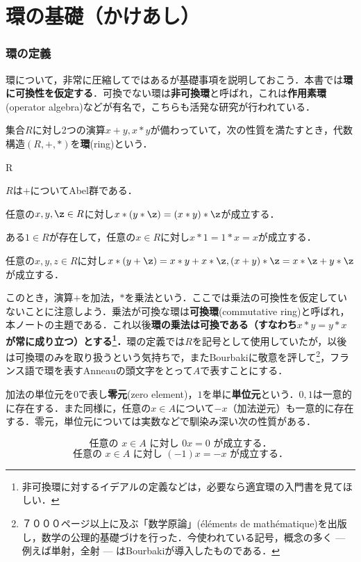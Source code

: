 \setcounter{part}{-1}
\part[Definition of Ring and more...]{環の基礎（かけあし）}
\section{環の定義}

環について，非常に圧縮してではあるが基礎事項を説明しておこう．本書では\textbf{環に可換性を仮定する}．可換でない環は\textbf{非可換環}と呼ばれ，これは\textbf{作用素環}(operator algebra)などが有名で，こちらも活発な研究が行われている．
\begin{defi}[環]
	集合$R$に対し2つの演算$x+y,x*y$が備わっていて，次の性質を満たすとき，代数構造$(R,+,*)$を\textbf{環}(ring)という．
	\begin{defiterm}{R}
		\item $R$は$+$についてAbel群である．
		\item 任意の$x,y,\z\in R$に対し$x*(y*\z)=(x*y)*\z$が成立する．
		\item ある$1\in R$が存在して，任意の$x\in R$に対し$x*1=1*x=x$が成立する．
		\item 任意の$x,y,z\in R$に対し$x*(y+\z)=x*y+x*\z,(x+y)*\z=x*\z+y*\z$が成立する．
	\end{defiterm}
\end{defi}

このとき，演算$+$を加法，$*$を乗法という．ここでは乗法の可換性を仮定していないことに注意しよう．乗法が可換な環は\textbf{可換環}(commutative ring)と呼ばれ，本ノートの主題である．これ以後\textbf{環の乗法は可換である（すなわち$x*y=y*x$が常に成り立つ）とする\footnote{非可換環に対するイデアルの定義などは，必要なら適宜環の入門書を見てほしい．}．}環の定義では$R$を記号として使用していたが，以後は可換環のみを取り扱うという気持ちで，またBourbakiに敬意を評して\footnote{７０００ページ以上に及ぶ「数学原論」(\'el\'ements de math\'ematique)を出版し，数学の公理的基礎づけを行った．今使われている記号，概念の多く --- 例えば単射，全射 --- はBourbakiが導入したものである．}，フランス語で環を表すAnneauの頭文字をとって$A$で表すことにする．

加法の単位元を$0$で表し\textbf{零元}(zero element)，$1$を単に\textbf{単位元}という．$0,1$は一意的に存在する．また同様に，任意の$x\in A$について$-x$（加法逆元）も一意的に存在する．零元，単位元については実数などで馴染み深い次の性質がある．

\[\text{任意の }x\in A\text{ に対し }0x=0\text{ が成立する．}\]
\[\text{任意の }x\in A\text{ に対し }(-1)x=-x\text{ が成立する．}\]

